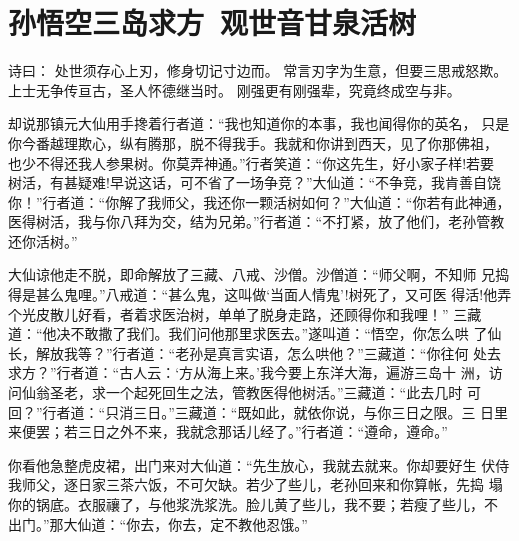 \chapter{孙悟空三岛求方~观世音甘泉活树}

诗曰：
处世须存心上刃，修身切记寸边而。
常言刃字为生意，但要三思戒怒欺。
上士无争传亘古，圣人怀德继当时。
刚强更有刚强辈，究竟终成空与非。

却说那镇元大仙用手搀着行者道：“我也知道你的本事，我也闻得你的英名，
只是你今番越理欺心，纵有腾那，脱不得我手。我就和你讲到西天，见了你那佛祖，
也少不得还我人参果树。你莫弄神通。”行者笑道：“你这先生，好小家子样!若要
树活，有甚疑难!早说这话，可不省了一场争竞？”大仙道：“不争竞，我肯善自饶
你！”行者道：“你解了我师父，我还你一颗活树如何？”大仙道：“你若有此神通，
医得树活，我与你八拜为交，结为兄弟。”行者道：“不打紧，放了他们，老孙管教
还你活树。”

大仙谅他走不脱，即命解放了三藏、八戒、沙僧。沙僧道：“师父啊，不知师
兄捣得是甚么鬼哩。”八戒道：“甚么鬼，这叫做‘当面人情鬼’!树死了，又可医
得活!他弄个光皮散儿好看，者着求医治树，单单了脱身走路，还顾得你和我哩！”
三藏道：“他决不敢撒了我们。我们问他那里求医去。”遂叫道：“悟空，你怎么哄
了仙长，解放我等？”行者道：“老孙是真言实语，怎么哄他？”三藏道：“你往何
处去求方？”行者道：“古人云：‘方从海上来。’我今要上东洋大海，遍游三岛十
洲，访问仙翁圣老，求一个起死回生之法，管教医得他树活。”三藏道：“此去几时
可回？”行者道：“只消三日。”三藏道：“既如此，就依你说，与你三日之限。三
日里来便罢；若三日之外不来，我就念那话儿经了。”行者道：“遵命，遵命。”

你看他急整虎皮裙，出门来对大仙道：“先生放心，我就去就来。你却要好生
伏侍我师父，逐日家三茶六饭，不可欠缺。若少了些儿，老孙回来和你算帐，先捣
塌你的锅底。衣服禳了，与他浆洗浆洗。脸儿黄了些儿，我不要；若瘦了些儿，不
出门。”那大仙道：“你去，你去，定不教他忍饿。”

